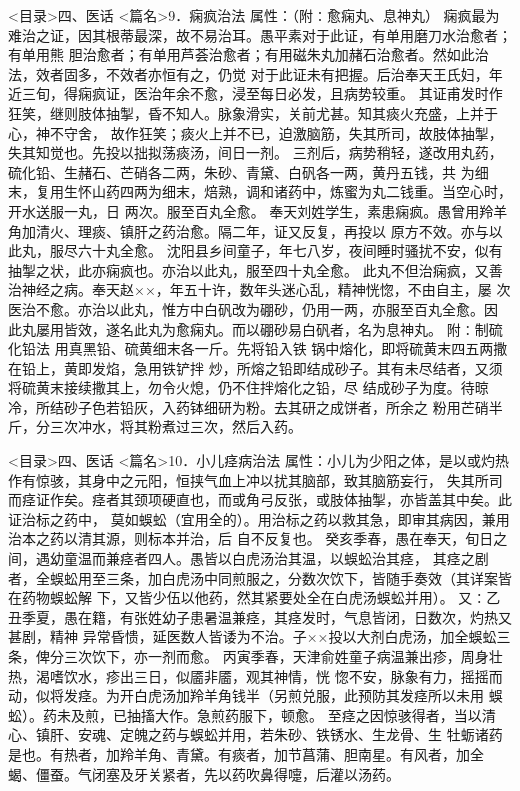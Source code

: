 \documentclass[a4paper,12pt,UTF8,twoside]{ctexbook}
\begin{document}
<目录>四、医话
<篇名>9．痫疯治法
属性：（附∶愈痫丸、息神丸） 
痫疯最为难治之证，因其根蒂最深，故不易治耳。愚平素对于此证，有单用磨刀水治愈者；有单用熊 
胆治愈者；有单用芦荟治愈者；有用磁朱丸加赭石治愈者。然如此治法，效者固多，不效者亦恒有之，仍觉 
对于此证未有把握。后治奉天王氏妇，年近三旬，得痫疯证，医治年余不愈，浸至每日必发，且病势较重。 
其证甫发时作狂笑，继则肢体抽掣，昏不知人。脉象滑实，关前尤甚。知其痰火充盛，上并于心，神不守舍， 
故作狂笑；痰火上并不已，迫激脑筋，失其所司，故肢体抽掣，失其知觉也。先投以拙拟荡痰汤，间日一剂。 
三剂后，病势稍轻，遂改用丸药，硫化铅、生赭石、芒硝各二两，朱砂、青黛、白矾各一两，黄丹五钱，共 
为细末，复用生怀山药四两为细末，焙熟，调和诸药中，炼蜜为丸二钱重。当空心时，开水送服一丸，日 
两次。服至百丸全愈。 
奉天刘姓学生，素患痫疯。愚曾用羚羊角加清火、理痰、镇肝之药治愈。隔二年，证又反复，再投以 
原方不效。亦与以此丸，服尽六十丸全愈。 
沈阳县乡间童子，年七八岁，夜间睡时骚扰不安，似有抽掣之状，此亦痫疯也。亦治以此丸，服至四十丸全愈。 
此丸不但治痫疯，又善治神经之病。奉天赵××，年五十许，数年头迷心乱，精神恍惚，不由自主，屡 
次医治不愈。亦治以此丸，惟方中白矾改为硼砂，仍用一两，亦服至百丸全愈。因 
此丸屡用皆效，遂名此丸为愈痫丸。而以硼砂易白矾者，名为息神丸。 
附∶制硫化铅法 用真黑铅、硫黄细末各一斤。先将铅入铁 
锅中熔化，即将硫黄末四五两撒在铅上，黄即发焰，急用铁铲拌 
炒，所熔之铅即结成砂子。其有未尽结者，又须将硫黄末接续撒其上，勿令火熄，仍不住拌熔化之铅，尽 
结成砂子为度。待晾冷，所结砂子色若铅灰，入药钵细研为粉。去其研之成饼者，所余之 
粉用芒硝半斤，分三次冲水，将其粉煮过三次，然后入药。 

<目录>四、医话
<篇名>10．小儿痉病治法
属性：小儿为少阳之体，是以或灼热作有惊骇，其身中之元阳，恒挟气血上冲以扰其脑部，致其脑筋妄行， 
失其所司而痉证作矣。痉者其颈项硬直也，而或角弓反张，或肢体抽掣，亦皆盖其中矣。此证治标之药中， 
莫如蜈蚣（宜用全的）。用治标之药以救其急，即审其病因，兼用治本之药以清其源，则标本并治，后 
自不反复也。 
癸亥季春，愚在奉天，旬日之间，遇幼童温而兼痉者四人。愚皆以白虎汤治其温，以蜈蚣治其痉， 
其痉之剧者，全蜈蚣用至三条，加白虎汤中同煎服之，分数次饮下，皆随手奏效（其详案皆在药物蜈蚣解 
下，又皆少伍以他药，然其紧要处全在白虎汤蜈蚣并用）。 
又∶乙丑季夏，愚在籍，有张姓幼子患暑温兼痉，其痉发时，气息皆闭，日数次，灼热又甚剧，精神 
异常昏愦，延医数人皆诿为不治。子××投以大剂白虎汤，加全蜈蚣三条，俾分三次饮下，亦一剂而愈。 
丙寅季春，天津俞姓童子病温兼出疹，周身壮热，渴嗜饮水，疹出三日，似靥非靥，观其神情，恍 
惚不安，脉象有力，摇摇而动，似将发痉。为开白虎汤加羚羊角钱半（另煎兑服，此预防其发痉所以未用 
蜈蚣）。药未及煎，已抽搐大作。急煎药服下，顿愈。 
至痉之因惊骇得者，当以清心、镇肝、安魂、定魄之药与蜈蚣并用，若朱砂、铁锈水、生龙骨、生 
牡蛎诸药是也。有热者，加羚羊角、青黛。有痰者，加节菖蒲、胆南星。有风者，加全 
蝎、僵蚕。气闭塞及牙关紧者，先以药吹鼻得嚏，后灌以汤药。 
\end{document}

